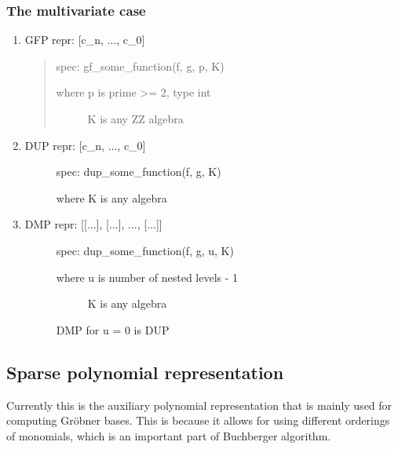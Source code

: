 \subsubsection{The multivariate case}
\begin{enumerate}
\item {} 
GFP repr: {[}c\_n, ..., c\_0{]}
\begin{quote}

spec: gf\_some\_function(f, g, p, K)
\begin{description}
\item[where p is prime \textgreater{}= 2, type int] \leavevmode
K is any ZZ algebra

\end{description}
\end{quote}

\item {} \begin{description}
\item[DUP repr: {[}c\_n, ..., c\_0{]}] \leavevmode
spec: dup\_some\_function(f, g, K)

where K is any algebra

\end{description}

\item {} \begin{description}
\item[DMP repr: {[}{[}...{]}, {[}...{]}, ..., {[}...{]}{]}] \leavevmode
spec: dup\_some\_function(f, g, u, K)
\begin{description}
\item[where u is number of nested levels - 1] \leavevmode
K is any algebra

\end{description}

DMP for u = 0 is DUP

\end{description}

\end{enumerate}


\subsection{Sparse polynomial representation}

Currently this is the auxiliary polynomial representation that is mainly used for computing
Gröbner bases. This is because it allows for using different orderings of monomials, which
is an important part of Buchberger algorithm.


